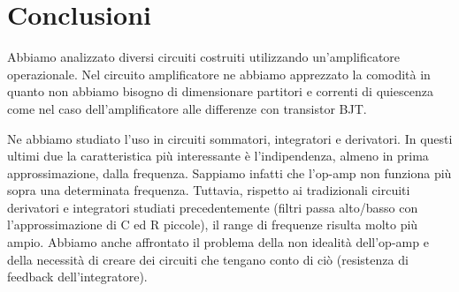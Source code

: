 \section{Conclusioni}

Abbiamo analizzato diversi circuiti costruiti utilizzando un'amplificatore operazionale. Nel circuito amplificatore ne abbiamo apprezzato la comodità in quanto non abbiamo bisogno di dimensionare partitori e correnti di quiescenza come nel caso dell'amplificatore alle differenze con transistor BJT. 


Ne abbiamo studiato l'uso in circuiti sommatori, integratori e derivatori. In questi ultimi due la caratteristica più interessante è l'indipendenza, almeno in prima approssimazione, dalla frequenza. Sappiamo infatti che l'op-amp non funziona più sopra una determinata frequenza. Tuttavia, rispetto ai tradizionali circuiti derivatori e integratori studiati precedentemente (filtri passa alto/basso con l'approssimazione di C ed R piccole), il range di frequenze risulta molto più ampio. Abbiamo anche affrontato il problema della non idealità dell'op-amp e della necessità di creare dei circuiti che tengano conto di ciò (resistenza di feedback dell'integratore).